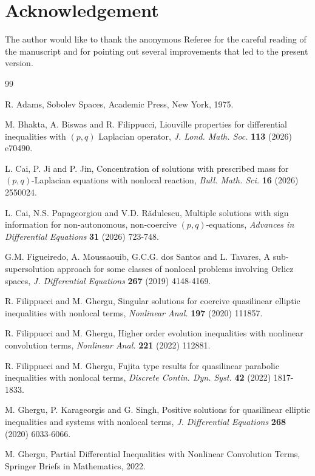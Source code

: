\documentclass[leqno,12pt]{article}
\numberwithin{equation}{section}
\begin{document}
\section*{Acknowledgement} The author would like to thank the anonymous Referee for the careful reading of the manuscript and for pointing out several improvements that led to the present version.
\begin{thebibliography}{99}

 R. Adams, Sobolev Spaces, Academic Press, New York, 1975.

 M. Bhakta, A. Biswas and R. Filippucci, 
Liouville properties for differential inequalities with $(p,q)$ Laplacian operator, {\it  J. Lond. Math. Soc.} {\bf 113} (2026) e70490. 

 L. Cai, P. Ji and P. Jin, Concentration of solutions with prescribed mass for 
$(p,q)$-Laplacian equations with nonlocal reaction,  {\it Bull. Math. Sci.} {\bf 16} (2026) 2550024.

 L. Cai, N.S. Papageorgiou and V.D. R\u adulescu, Multiple solutions with sign information for non-autonomous, non-coercive $(p,q)$-equations,  {\it Advances in Differential Equations} {\bf 31} (2026) 723-748.

 G.M. Figueiredo, A. Moussaouib, G.C.G. dos Santos and L. Tavares, A sub-supersolution approach for some classes of nonlocal problems involving Orlicz spaces, {\it J. Differential Equations} {\bf 267} (2019) 4148-4169.

 R. Filippucci and M. Ghergu,  Singular solutions for coercive quasilinear elliptic inequalities with nonlocal terms, {\it Nonlinear Anal.} {\bf 197} (2020) 111857.


 R. Filippucci and M. Ghergu, Higher order evolution inequalities with nonlinear convolution terms, 
{\it Nonlinear Anal.} {\bf 221} (2022) 112881.

 R. Filippucci and M. Ghergu, Fujita type results for quasilinear parabolic inequalities with nonlocal terms, {\it Discrete Contin. Dyn. Syst.} {\bf 42} (2022)  1817-1833.

 M. Ghergu, P. Karageorgis and G. Singh, Positive solutions for quasilinear elliptic inequalities and systems with nonlocal terms, {\it J. Differential Equations} {\bf 268} (2020) 6033-6066. 

 M. Ghergu, Partial Differential Inequalities with Nonlinear Convolution Terms, Springer Briefs in Mathematics, 2022.


\end{thebibliography}
\end{document}
